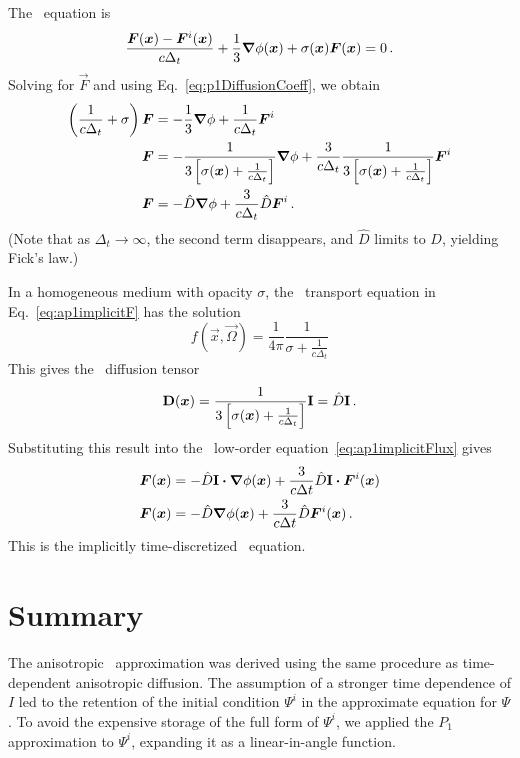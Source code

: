 The \Pone\ equation is
\begin{equation*}
  \frac{\bm{F}(\bm{x}) - \bm{F}^i(\bm{x})}{c \Delta_t}
  + \frac{1}{3} \bm{\nabla} \phi(\bm{x})
  + \sigma (\bm{x}) \bm{F}(\bm{x})
  = 0\,.
\end{equation*}
Solving for $\vec{F}$ and using Eq.~\eqref{eq:p1DiffusionCoeff}, we obtain
\begin{align*}
  \left( \frac{1}{c \Delta_t} + \sigma \right) \bm{F}
 &=
 - \frac{1}{3} \bm{\nabla} \phi
 + \frac{1}{c \Delta_t} \bm{F}^i
 \\
  \bm{F}
 &=
 - \frac{1}{3 \left[ \sigma(\bm{x}) + \frac{1}{c \Delta_t} \right]} \bm{\nabla} \phi
 + \frac{3}{c \Delta_t} \frac{1}{3 \left[ \sigma(\bm{x})
  + \frac{1}{c \Delta_t} \right]} \bm{F}^i
 \\
  \bm{F}
 &=
 - \hat D \bm{\nabla} \phi
 + \frac{3}{c \Delta_t} \hat D \bm{F}^i\,.
\end{align*}
(Note that as $\Delta_t\to\infty$, the second term disappears, and $\hat D$
limits to $D$, yielding Fick's law.)

In a homogeneous medium with opacity $\sigma$, the \APone\ transport equation
in Eq.~\eqref{eq:ap1implicitF} has the solution
\begin{equation*}
  f(\vec{x},\vec{\Omega})
  = \frac{1}{4\pi} \frac{1}{\sigma + \frac{1}{c \Delta_t}}
\end{equation*}
This gives the \APone\ diffusion tensor
\begin{equation*}
  \mathbf{D}(\bm{x}) = \frac{1}{3 \left[ \sigma(\bm{x}) + \frac{1}{c \Delta_t}
  \right]} \mathbf{I} = \hat D \mathbf{I} \,.
\end{equation*}
Substituting this result into the \APone\ low-order
equation~\eqref{eq:ap1implicitFlux} gives
\begin{align*}
  \bm{F}(\bm{x}) &=
  - \hat D \mathbf{I} \bm{\cdot} \bm{\nabla} \phi (\bm{x})
  + \frac{3}{c \Delta t} \hat D \mathbf{I} \bm{\cdot} \bm{F}^i(\bm{x})
  \\
  \bm{F}(\bm{x}) &=
  - \hat D \bm{\nabla} \phi (\bm{x})
  + \frac{3}{c \Delta t} \hat D \bm{F}^i(\bm{x})\,.
\end{align*}
This is the implicitly time-discretized \Pone\ equation.

\section{Summary}
The anisotropic \Pone\ approximation was derived using the same procedure as 
time-dependent anisotropic diffusion. The assumption of a stronger time
dependence of $I$ led to the retention of the initial condition $\Psi^i$ in the
approximate equation for $\Psi$. To avoid the expensive storage of the full form
of $\Psi^i$, we applied the $P_1$ approximation to $\Psi^i$, expanding it as a
linear-in-angle function.

